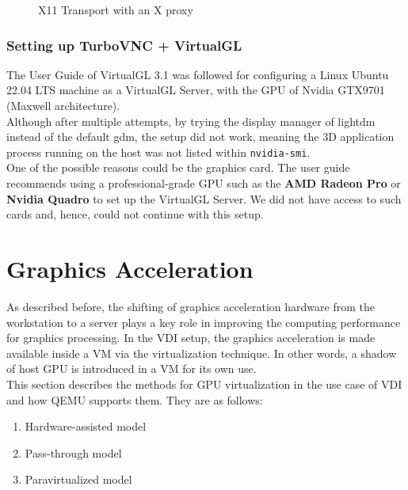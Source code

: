 \documentclass[a4paper,12pt, final]{report}
\begin{document}
\begin{enumerate}
\begin{figure}[H]
            \caption{X11 Transport with an X proxy \cite{virtualgl_userguide}}
            \label{fig:x11_transport}
        \end{figure}
\end{enumerate}

\subsection{Setting up TurboVNC + VirtualGL}
The User Guide of VirtualGL 3.1 \cite{virtualgl_userguide} was followed for configuring a Linux Ubuntu 22.04 LTS machine as a VirtualGL Server, with the GPU of Nvidia GTX9701 (Maxwell architecture).\\

\noindent Although after multiple attempts, by trying the display manager of lightdm instead of the default gdm, the setup did not work, meaning the 3D application process running on the host was not listed within \verb|nvidia-smi|.\\

\noindent One of the possible reasons could be the graphics card. The user guide recommends using a professional-grade GPU such as the \textbf{AMD Radeon Pro} or \textbf{Nvidia Quadro} to set up the VirtualGL Server. We did not have access to such cards and, hence, could not continue with this setup.

\chapter{Graphics Acceleration}

As described before, the shifting of graphics acceleration hardware from the workstation to a server plays a key role in improving the computing performance for graphics processing. In the VDI setup, the graphics acceleration is made available inside a VM via the virtualization technique. In other words, a shadow of host GPU is introduced in a VM for its own use.\\

\noindent This section describes the methods for GPU virtualization in the use case of VDI and how QEMU supports them. They are as follows:

\begin{enumerate}
    \item Hardware-assisted model
    \item Pass-through model
    \item Paravirtualized model
\end{enumerate}
\end{document}
